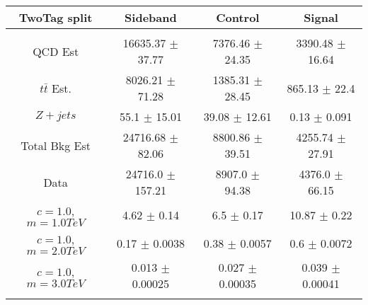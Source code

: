 \begin{footnotesize} 
\begin{tabular}{c|c|c|c} 
TwoTag split & Sideband & Control & Signal \\ 
\hline\hline 
& & & \\ 
QCD Est & 16635.37 $\pm$ 37.77 & 7376.46 $\pm$ 24.35 & 3390.48 $\pm$ 16.64\\ 
$t\bar{t}$ Est.  & 8026.21 $\pm$ 71.28 & 1385.31 $\pm$ 28.45 & 865.13 $\pm$ 22.4\\ 
$Z+jets$ & 55.1 $\pm$ 15.01 & 39.08 $\pm$ 12.61 & 0.13 $\pm$ 0.091\\ 
Total Bkg Est & 24716.68 $\pm$ 82.06 & 8800.86 $\pm$ 39.51 & 4255.74 $\pm$ 27.91\\ 
Data & 24716.0 $\pm$ 157.21 & 8907.0 $\pm$ 94.38 & 4376.0 $\pm$ 66.15\\ 
$c=1.0$,$m=1.0TeV$ & 4.62 $\pm$ 0.14 & 6.5 $\pm$ 0.17 & 10.87 $\pm$ 0.22\\ 
$c=1.0$,$m=2.0TeV$ & 0.17 $\pm$ 0.0038 & 0.38 $\pm$ 0.0057 & 0.6 $\pm$ 0.0072\\ 
$c=1.0$,$m=3.0TeV$ & 0.013 $\pm$ 0.00025 & 0.027 $\pm$ 0.00035 & 0.039 $\pm$ 0.00041\\ 
& & & \\ 
\hline\hline 
\end{tabular} 
\end{footnotesize} 
\newline 
